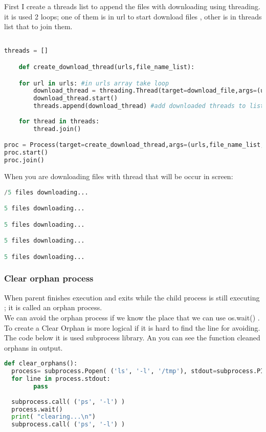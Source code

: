 \documentclass[onecolumn]{article}
\begin{document}
First I create a threads list to append the files with downloading using threading.
 it is used 2 loops; one of them is in url to start download files , other is in threads list that  to join them.

\begin{lstlisting}[language=Python, caption=Creating Threads]

threads = []

    def create_download_thread(urls,file_name_list):

    for url in urls: #in urls array take loop
        download_thread = threading.Thread(target=download_file,args=(url,file_name_list,))
        download_thread.start()
        threads.append(download_thread) #add downloaded threads to list
        
    for thread in threads:
        thread.join()

proc = Process(target=create_download_thread,args=(urls,file_name_list,))
proc.start()
proc.join()

\end{lstlisting}

When you are downloading files with thread that will be occur in screen:

\begin{lstlisting}[language=Python, caption=Output]
/5 files downloading...

5 files downloading...

5 files downloading...

5 files downloading...

5 files downloading...
\end{lstlisting}


\subsubsection{Clear orphan process}

When parent finishes execution and exits while the child process is still executing ; it is called an orphan process.\\ 
We can avoid the orphan process if we know the place that we can use os.wait() . To create a Clear Orphan  is more logical if it is hard to find the line for avoiding. The code below it is used subprocess library. An you can see the function cleaned orphans in output.

\begin{lstlisting}[language=Python, caption= Clear Orphans ]
def clear_orphans(): 
  process= subprocess.Popen( ('ls', '-l', '/tmp'), stdout=subprocess.PIPE)
  for line in process.stdout:
        pass
    
  subprocess.call( ('ps', '-l') )
  process.wait()
  print( "clearing...\n")
  subprocess.call( ('ps', '-l') )

\end{lstlisting}
\end{document}
